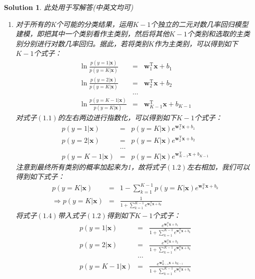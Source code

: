 \documentclass[a4paper,UTF8]{article}
\numberwithin{equation}{section}
\newtheorem*{solution}{Solution}
\begin{document}
\begin{solution}
此处用于写解答(中英文均可)
\begin{enumerate}
	\item 对于所有的K个可能的分类结果，运用$K-1$个独立的二元对数几率回归模型建模，即把其中一个类别看作主类别，然后将其他$K-1$个类别和选取的主类别分别进行对数几率回归。据此，若将类别$K$作为主类别，可以得到如下$K-1$个式子：
		\begin{eqnarray}
			\ln\frac{p(y=1|\mathbf{x})}{p(y=K|\mathbf{x})}&=&\mathbf{w}_1^\mathrm{T}\mathbf{x}+b_1\\
			\ln\frac{p(y=2|\mathbf{x})}{p(y=K|\mathbf{x})}&=&\mathbf{w}_2^\mathrm{T}\mathbf{x}+b_2 \nonumber\\
			&\dots& \nonumber\\
			\ln\frac{p(y={K-1}|\mathbf{x})}{p(y=K|\mathbf{x})}&=&\mathbf{w}_{K-1}^\mathrm{T}\mathbf{x}+b_{K-1} \nonumber
		\end{eqnarray}
		对式子$(1.1)$的左右两边进行指数化，可以得到如下$K-1$个式子：
		\begin{eqnarray}
			p(y=1|\mathbf{x})&=&p(y=K|\mathbf{x})e^{\mathbf{w}_1^\mathrm{T}\mathbf{x}+b_1}\\
			p(y=2|\mathbf{x})&=&p(y=K|\mathbf{x})e^{\mathbf{w}_2^\mathrm{T}\mathbf{x}+b_2} \nonumber\\
			&\dots& \nonumber\\
			p(y={K-1}|\mathbf{x})&=&p(y=K|\mathbf{x})e^{\mathbf{w}_{K-1}^\mathrm{T}\mathbf{x}+b_{K-1}} \nonumber
		\end{eqnarray}
		注意到最终所有类别的概率加起来为1，故将式子$(1.2)$左右相加，我们可以得到如下式子：
		\begin{eqnarray}
			p(y=K|\mathbf{x})&=&1-\sum_{k=1}^{K-1}p(y=K|\mathbf{x})e^{\mathbf{w}_k^\mathrm{T}\mathbf{x}+b_k}\\
			\Rightarrow p(y=K|\mathbf{x})&=&\frac{1}{1+\sum_{k=1}^{K-1} e^{\mathbf{w}_k^\mathrm{T}\mathbf{x}+b_k}}
		\end{eqnarray}
		将式子$(1.4)$带入式子$(1.2)$得到如下$K-1$个式子：
		\begin{eqnarray}
			p(y=1|\mathbf{x})&=&\frac{e^{\mathbf{w}_1^\mathrm{T}\mathbf{x}+b_1}}{1+\sum_{k=1}^{K-1} e^{\mathbf{w}_k^\mathrm{T}\mathbf{x}+b_k}}\\
			p(y=2|\mathbf{x})&=&\frac{e^{\mathbf{w}_2^\mathrm{T}\mathbf{x}+b_2}}{1+\sum_{k=1}^{K-1} e^{\mathbf{w}_k^\mathrm{T}\mathbf{x}+b_k}} \nonumber\\
			&\dots& \nonumber\\
			p(y={K-1}|\mathbf{x})&=&\frac{e^{\mathbf{w}_{K-1}^\mathrm{T}\mathbf{x}+b_{K-1}}}{1+\sum_{k=1}^{K-1} e^{\mathbf{w}_k^\mathrm{T}\mathbf{x}+b_k}} \nonumber

\end{eqnarray}
\end{enumerate}
\end{solution}
\end{document}
